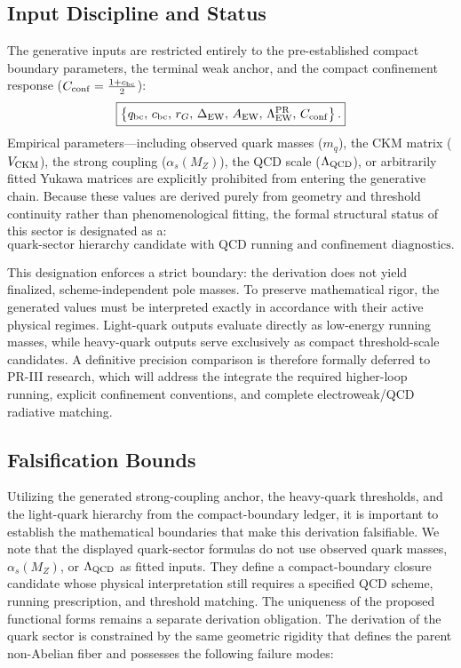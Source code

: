 \documentclass[11pt]{article}
\begin{document}
\subsection{Input Discipline and Status}
\label{sec:pr2_quark_input_discipline_status}

The generative inputs are restricted entirely to the pre-established compact boundary parameters, the terminal weak anchor, and the compact confinement response (\(C_{\rm conf} = \frac{1+c_{\rm bc}}{2}\)):
\begin{equation}
\boxed{
\left\{
q_{\rm bc},\,
c_{\rm bc},\,
r_G,\,
\Delta_{\rm EW},\,
A_{\rm EW},\,
\Lambda_{\rm EW}^{\rm PR},\,
C_{\rm conf}
\right\}.
}
\end{equation}
Empirical parameters—including observed quark masses (\(m_q\)), the CKM matrix (\(V_{\rm CKM}\)), the strong coupling (\(\alpha_s(M_Z)\)), the QCD scale (\(\Lambda_{\rm QCD}\)), or arbitrarily fitted Yukawa matrices are explicitly prohibited from entering the generative chain. Because these values are derived purely from geometry and threshold continuity rather than phenomenological fitting, the formal structural status of this sector is designated as a:
\begin{equation}
\boxed{
\text{quark-sector hierarchy candidate with QCD running and confinement diagnostics}.
}
\end{equation}

This designation enforces a strict boundary: the derivation does not yield finalized, scheme-independent pole masses. To preserve mathematical rigor, the generated values must be interpreted exactly in accordance with their active physical regimes. Light-quark outputs evaluate directly as low-energy running masses, while heavy-quark outputs serve exclusively as compact threshold-scale candidates. A definitive precision comparison is therefore formally deferred to PR-III research, which will address the integrate the required higher-loop running, explicit confinement conventions, and complete electroweak/QCD radiative matching.

\subsection{Falsification Bounds}
\label{sec:pr2_quark_negative_controls}

Utilizing the generated strong-coupling anchor, the heavy-quark thresholds, and the light-quark hierarchy from the compact-boundary ledger, it is important to establish the mathematical boundaries that make this derivation falsifiable. We note that the displayed quark-sector formulas do not use observed quark masses, \(\alpha_s(M_Z)\), or \(\Lambda_{\rm QCD}\) as fitted inputs. They define a compact-boundary closure candidate whose physical interpretation still requires a specified QCD scheme, running prescription, and threshold matching. The uniqueness of the proposed functional forms remains a separate derivation obligation. The derivation of the quark sector is constrained by the same geometric rigidity that defines the parent non-Abelian fiber and possesses the following failure modes:
\end{document}
